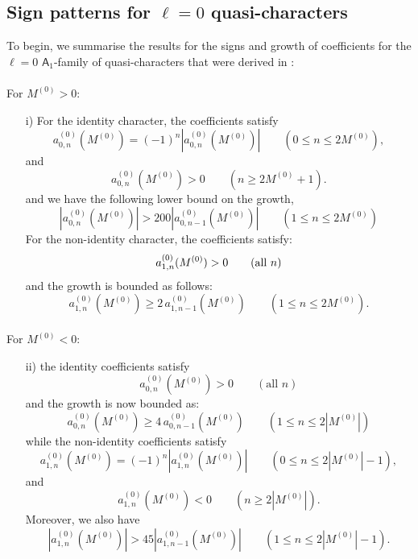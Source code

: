 \documentclass[11pt]{article}
\newcommand\be{\begin{equation}}
\newcommand\ee{\end{equation}}
\newcommand\mA{{\mathsf A}}
\begin{document}
\subsection{Sign patterns for \(\ell=0\) quasi-characters}

To begin, we summarise the results for the signs and growth of coefficients for the \(\ell=0\) \(\mA_1\)-family of quasi-characters that were derived in \cite{Das:2025gto}:
\paragraph{} For \(M^{(0)}>0\):
\begin{itemize}
\item[i)] For the identity character, the coefficients satisfy
\be\label{eq:N>0_id_0}
        a^{(0)}_{0,n}(M^{(0)})
        =
        (-1)^n|a^{(0)}_{0,n}(M^{(0)})|
        \qquad(0\le n\le2M^{(0)}),
\ee
and
\be\label{eq:N>0_id_1}
        a^{(0)}_{0,n}(M^{(0)})>0
        \qquad(n\ge2M^{(0)}+1).
\ee
and we have the following lower bound on the growth,
\be\label{eq:N>0_id_2}
        |a^{(0)}_{0,n}(M^{(0)})|
        >
        200|a^{(0)}_{0,n-1}(M^{(0)})|
        \qquad(1\le n\le2M^{(0)})
\ee
For the non-identity character, the coefficients satisfy:
\be\label{eq:N>0_nid_0}
        a^{(0)}_{1,n}(M^{(0)})>0
        \qquad (\hbox{all }n)
\ee
and the growth is bounded as follows:
\be\label{eq:N>0_nid_1}
        a^{(0)}_{1,n}(M^{(0)})
        \ge
        2\,a^{(0)}_{1,n-1}(M^{(0)})
        \qquad(1\le n\le2M^{(0)}).
\ee
\end{itemize}

\paragraph{} For \(M^{(0)}<0\):
\begin{itemize}
\item[ii)] the identity coefficients satisfy
\be\label{eq:N<0_id_0}
        a^{(0)}_{0,n}(M^{(0)})>0
        \qquad(\text{all }n)
\ee
and the growth is now bounded as:
\be\label{eq:N<0_id_1}
        a^{(0)}_{0,n}(M^{(0)})
        \ge
        4\,a^{(0)}_{0,n-1}(M^{(0)})
        \qquad(1\le n\le2|M^{(0)}|)
\ee
while the non-identity coefficients satisfy
\be\label{eq:N<0_nid_0}
        a^{(0)}_{1,n}(M^{(0)})
        =
        (-1)^n|a^{(0)}_{1,n}(M^{(0)})|
        \qquad(0\le n\le2|M^{(0)}|-1),
\ee
and
\be\label{eq:N<0_nid_1}
        a^{(0)}_{1,n}(M^{(0)})<0
        \qquad(n\ge2|M^{(0)}|).
\ee
Moreover, we also have
\be\label{eq:N<0_nid_2}
        |a^{(0)}_{1,n}(M^{(0)})|
        >
        45|a^{(0)}_{1,n-1}(M^{(0)})|
        \qquad(1\le n\le2|M^{(0)}|-1).
\ee
\end{itemize}
\end{document}
